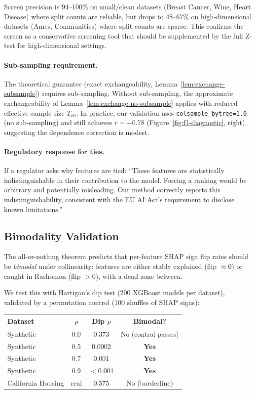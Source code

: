 \documentclass{article}
\begin{document}
Screen precision is 94--100\% on small/clean datasets (Breast Cancer, Wine, Heart Disease) where split counts are reliable, but drops to 48--67\% on high-dimensional datasets (Ames, Communities) where split counts are sparse. This confirms the screen as a conservative screening tool that should be supplemented by the full Z-test for high-dimensional settings.

\paragraph{Sub-sampling requirement.}
The theoretical guarantee (exact exchangeability,
Lemma~\ref{lem:exchange-subsample}) requires sub-sampling.
Without sub-sampling, the approximate exchangeability of
Lemma~\ref{lem:exchange-no-subsample} applies with reduced effective
sample size $T_{\text{eff}}$.
In practice, our validation uses \texttt{colsample\_bytree=1.0}
(no sub-sampling) and still achieves $r = -0.78$
(Figure~\ref{fig:f1-diagnostic}, right), suggesting the dependence
correction is modest.

\paragraph{Regulatory response for ties.}
If a regulator asks why features are tied: ``These features are statistically indistinguishable in their contribution to the model. Forcing a ranking would be arbitrary and potentially misleading. Our method correctly reports this indistinguishability, consistent with the EU AI Act's requirement to disclose known limitations.''

\subsection{Bimodality Validation}
\label{sec:bimodality-validation}

The all-or-nothing theorem predicts that per-feature SHAP sign flip rates should be \emph{bimodal} under collinearity: features are either stably explained (flip $\approx 0$) or caught in Rashomon (flip $> 0$), with a dead zone between.

We test this with Hartigan's dip test (200 XGBoost models per dataset), validated by a permutation control (100 shuffles of SHAP signs):

\begin{center}
\small
\begin{tabular}{lccc}
\toprule
Dataset & $\rho$ & Dip $p$ & Bimodal? \\
\midrule
Synthetic & 0.0 & 0.373 & No (control passes) \\
Synthetic & 0.5 & 0.0002 & \textbf{Yes} \\
Synthetic & 0.7 & 0.001 & \textbf{Yes} \\
Synthetic & 0.9 & $<$0.001 & \textbf{Yes} \\
California Housing & real & 0.575 & No (borderline) \\
\bottomrule
\end{tabular}
\end{center}
\end{document}
